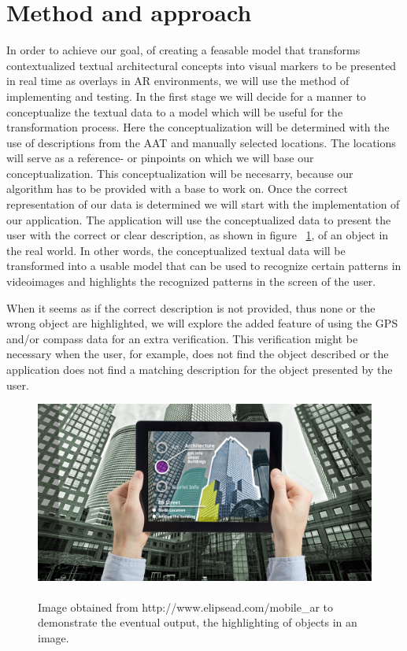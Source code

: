 \documentclass[12pt ,twocolumn]{article}
\begin{document}
\section{Method and approach}\label{method}
In order to achieve our goal, of creating a feasable model that transforms contextualized textual architectural concepts into visual markers to be presented in real time as overlays in AR environments, we will use the method of implementing and testing. 
In the first stage we will decide for a manner to  conceptualize the textual data to a model which will be useful for the transformation process. Here the conceptualization will be determined with the use of descriptions from the AAT and manually selected locations. The locations will serve as a reference- or pinpoints on which we will base our conceptualization. This conceptualization will be necesarry, because our algorithm has to be provided with a base to work on.
Once the correct representation of our data is determined we will start with the implementation of our application. The application will use the conceptualized data to present the user with the correct or clear description, as shown in figure ~\ref{fig:fig1}, of an object in the real world. In other words, the conceptualized textual data will be transformed into a usable model that can be used to recognize certain patterns in videoimages and highlights the recognized patterns in the screen of the user. 

When it seems as if the correct description is not provided, thus none or the wrong object are highlighted, we will explore the added feature of using the GPS and/or compass data for an extra verification. This verification might be necessary when the user, for example, does not find the object described or the application does not find a matching description for the object presented by the user. 

\begin{figure}
\includegraphics[scale=0.185]{AR_matching.png}
\captionsetup{font=scriptsize}
\caption{\\Image obtained from http://www.elipsead.com/mobile\_ar to demonstrate the eventual output, the highlighting of objects in an image.}
\label{fig:fig1}
\end{figure}
\end{document}

